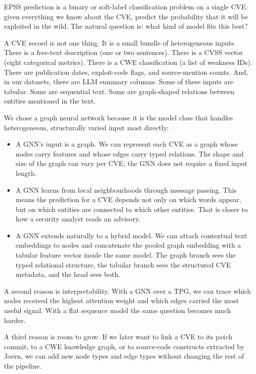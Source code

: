 \documentclass[11pt]{article}
\begin{document}
EPSS prediction is a binary or soft-label classification problem on a
single CVE: given everything we know about the CVE, predict the
probability that it will be exploited in the wild. The natural question
is: what kind of model fits this best?

A CVE record is not one thing. It is a small bundle of heterogeneous
inputs. There is a free-text description (one or two sentences). There
is a CVSS vector (eight categorical metrics). There is a CWE
classification (a list of weakness IDs). There are publication dates,
exploit-code flags, and source-mention counts. And, in our datasets,
there are LLM summary columns. Some of these inputs are tabular.
Some are sequential text. Some are graph-shaped relations between
entities mentioned in the text.

We chose a graph neural network because it is the model class that
handles heterogeneous, structurally varied input most directly:

\begin{itemize}
    \item A GNN's input is a graph. We can represent each CVE as a
    graph whose nodes carry features and whose edges carry typed
    relations. The shape and size of the graph can vary per CVE; the
    GNN does not require a fixed input length.
    \item A GNN learns from local neighbourhoods through message
    passing. This means the prediction for a CVE depends not only on
    which words appear, but on which entities are connected to which
    other entities. That is closer to how a security analyst reads an
    advisory.
    \item A GNN extends naturally to a hybrid model. We can attach
    contextual text embeddings to nodes and concatenate the pooled graph
    embedding with a tabular feature vector inside the same model. The
    graph branch sees the typed relational structure, the tabular branch
    sees the structured CVE metadata, and the head sees both.
\end{itemize}

A second reason is interpretability. With a GNN over a TPG, we can
trace which nodes received the highest attention weight and which edges
carried the most useful signal. With a flat sequence model the same
question becomes much harder.

A third reason is room to grow. If we later want to link a CVE to its
patch commit, to a CWE knowledge graph, or to source-code constructs
extracted by Joern, we can add new node types and edge types without
changing the rest of the pipeline.
\end{document}
